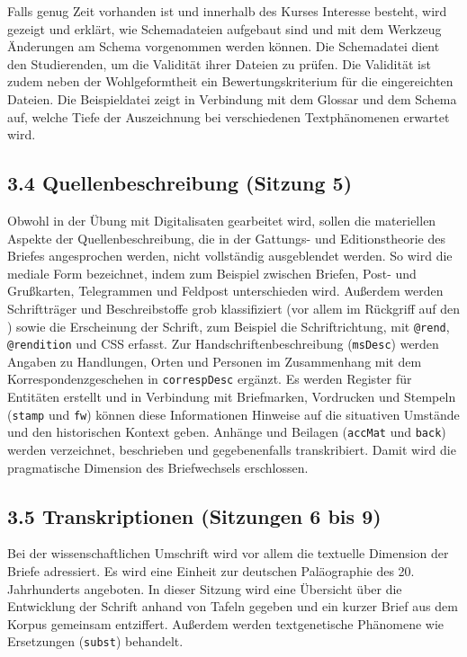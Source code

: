 \documentclass[
          a4paper,
        ]{article}
\newcommand{\passthrough}[1]{#1}
\begin{document}
Falls genug Zeit vorhanden ist und innerhalb des Kurses Interesse
besteht, wird gezeigt und erklärt, wie Schemadateien aufgebaut sind und
mit dem Werkzeug Änderungen am Schema vorgenommen werden können. Die
Schemadatei dient den Studierenden, um die Validität ihrer Dateien zu
prüfen. Die Validität ist zudem neben der Wohlgeformtheit ein
Bewertungskriterium für die eingereichten Dateien. Die Beispieldatei
zeigt in Verbindung mit dem Glossar und dem Schema auf, welche Tiefe der
Auszeichnung bei verschiedenen Textphänomenen erwartet wird.

\subsection{3.4 Quellenbeschreibung (Sitzung
5)}\label{quellenbeschreibung-sitzung-5}

Obwohl in der Übung mit Digitalisaten gearbeitet wird, sollen die
materiellen Aspekte der Quellenbeschreibung, die in der Gattungs- und
Editionstheorie des Briefes angesprochen werden, nicht vollständig
ausgeblendet werden. So wird die mediale Form bezeichnet, indem zum
Beispiel zwischen Briefen, Post- und Grußkarten, Telegrammen und
Feldpost unterschieden wird. Außerdem werden Schriftträger und
Beschreibstoffe grob klassifiziert (vor allem im Rückgriff auf den )
sowie die Erscheinung der Schrift, zum Beispiel die Schriftrichtung, mit
\passthrough{\lstinline!@rend!}, \passthrough{\lstinline!@rendition!}
und CSS erfasst. Zur Handschriftenbeschreibung
(\passthrough{\lstinline!msDesc!}) werden Angaben zu Handlungen, Orten
und Personen im Zusammenhang mit dem Korrespondenzgeschehen in
\passthrough{\lstinline!correspDesc!} ergänzt. Es werden Register für
Entitäten erstellt und in Verbindung mit Briefmarken, Vordrucken und
Stempeln (\passthrough{\lstinline!stamp!} und
\passthrough{\lstinline!fw!}) können diese Informationen Hinweise auf
die situativen Umstände und den historischen Kontext geben. Anhänge und
Beilagen (\passthrough{\lstinline!accMat!} und
\passthrough{\lstinline!back!}) werden verzeichnet, beschrieben und
gegebenenfalls transkribiert. Damit wird die pragmatische Dimension des
Briefwechsels erschlossen.

\subsection{3.5 Transkriptionen (Sitzungen 6 bis
9)}\label{transkriptionen-sitzungen-6-bis-9}

Bei der wissenschaftlichen Umschrift wird vor allem die textuelle
Dimension der Briefe adressiert. Es wird eine Einheit zur deutschen
Paläographie des 20. Jahrhunderts angeboten. In dieser Sitzung wird eine
Übersicht über die Entwicklung der Schrift anhand von Tafeln gegeben und
ein kurzer Brief aus dem Korpus gemeinsam entziffert. Außerdem werden
textgenetische Phänomene wie Ersetzungen
(\passthrough{\lstinline!subst!}) behandelt.
\end{document}
